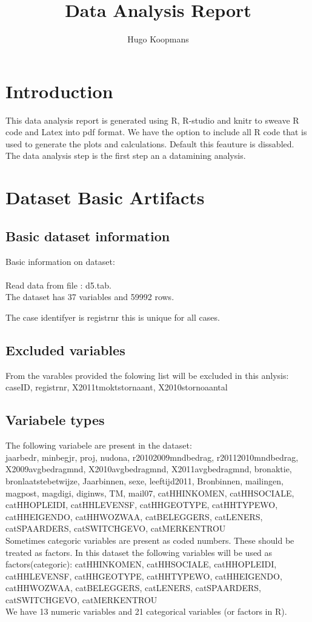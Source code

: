 \documentclass[10pt,a4paper,titlepage]{report}
\author{Hugo Koopmans}
\title{Data Analysis Report}
\begin{document}
\maketitle
\tableofcontents
\newpage
\section{Introduction}
This data analysis report is generated using R, R-studio and knitr to sweave R code and Latex into pdf format. We have the option to include all R code that is used to generate the plots and calculations. Default this feauture is dissabled.\\
The data analysis step is the first step an a datamining analysis.
\section{Dataset Basic Artifacts}

\subsection{Basic dataset information}
Basic information on dataset:\\






\\
Read data from file : d5.tab.\\
The dataset has 37 variables and 59992 rows.

The case identifyer is registrnr this is unique for all cases.

\subsection{Excluded variables}
From the varables provided the folowing list will be excluded in this anlysis: caseID, registrnr, X2011tmoktstornaant, X2010stornoaantal

\subsection{Variabele types}


The following variabele are present in the dataset:\\
jaarbedr, minbegjr, proj, nudona, r20102009mndbedrag, r20112010mndbedrag, X2009avgbedragmnd, X2010avgbedragmnd, X2011avgbedragmnd, bronaktie, bronlaatstebetwijze, Jaarbinnen, sexe, leeftijd2011, Bronbinnen, mailingen, magpost, magdigi, diginws, TM, mail07, catHHINKOMEN, catHHSOCIALE, catHHOPLEIDI, catHHLEVENSF, catHHGEOTYPE, catHHTYPEWO, catHHEIGENDO, catHHWOZWAA, catBELEGGERS, catLENERS, catSPAARDERS, catSWITCHGEVO, catMERKENTROU 
\\
Sometimes categoric variables are present as coded numbers. These should be treated as factors.
In this dataset the following variables will be used as factors(categoric): catHHINKOMEN, catHHSOCIALE, catHHOPLEIDI, catHHLEVENSF, catHHGEOTYPE, catHHTYPEWO, catHHEIGENDO, catHHWOZWAA, catBELEGGERS, catLENERS, catSPAARDERS, catSWITCHGEVO, catMERKENTROU
\\
We have 13 numeric variables and 21 categorical variables (or factors in R).
\newpage
\end{document}

